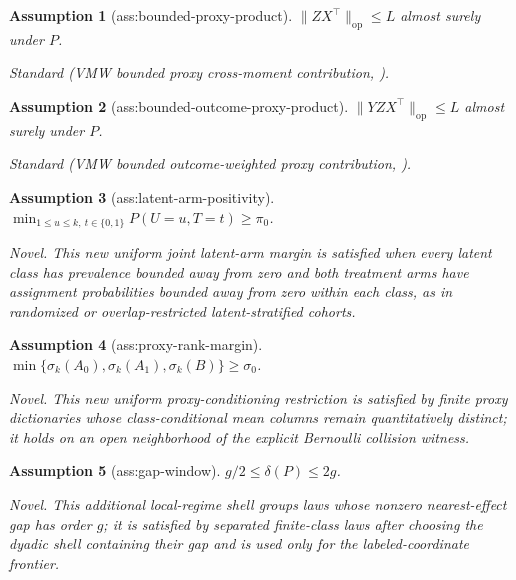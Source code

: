 \documentclass{article}
\newtheorem{assumption}{Assumption}
\begin{document}
\begin{assumption}[ass:bounded-proxy-product]\label{ass:bounded-proxy-product}
\(\lVert ZX^\top\rVert_{\mathrm{op}}\le L\) almost surely under \(P\).
\par\smallskip\noindent\emph{Standard} (VMW bounded proxy cross-moment contribution, \cite{VirkMazaheriWu2026}).
\end{assumption}

\begin{assumption}[ass:bounded-outcome-proxy-product]\label{ass:bounded-outcome-proxy-product}
\(\lVert YZX^\top\rVert_{\mathrm{op}}\le L\) almost surely under \(P\).
\par\smallskip\noindent\emph{Standard} (VMW bounded outcome-weighted proxy contribution, \cite{VirkMazaheriWu2026}).
\end{assumption}

\begin{assumption}[ass:latent-arm-positivity]\label{ass:latent-arm-positivity}
\(\min_{1\le u\le k,\ t\in\{0,1\}}P(U=u,T=t)\ge\pi_0\).
\par\smallskip\noindent\emph{Novel.} This new uniform joint latent-arm margin is satisfied when every latent class has prevalence bounded away from zero and both treatment arms have assignment probabilities bounded away from zero within each class, as in randomized or overlap-restricted latent-stratified cohorts.
\end{assumption}

\begin{assumption}[ass:proxy-rank-margin]\label{ass:proxy-rank-margin}
\(\min\{\sigma_k(A_0),\sigma_k(A_1),\sigma_k(B)\}\ge\sigma_0\).
\par\smallskip\noindent\emph{Novel.} This new uniform proxy-conditioning restriction is satisfied by finite proxy dictionaries whose class-conditional mean columns remain quantitatively distinct; it holds on an open neighborhood of the explicit Bernoulli collision witness.
\end{assumption}

\begin{assumption}[ass:gap-window]\label{ass:gap-window}
\(g/2\le\delta(P)\le2g\).
\par\smallskip\noindent\emph{Novel.} This additional local-regime shell groups laws whose nonzero nearest-effect gap has order \(g\); it is satisfied by separated finite-class laws after choosing the dyadic shell containing their gap and is used only for the labeled-coordinate frontier.
\end{assumption}
\end{document}
